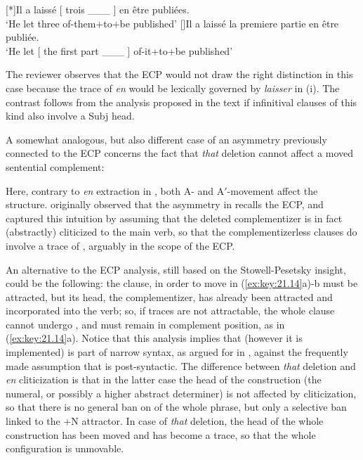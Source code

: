 \documentclass[output=paper]{langsci/langscibook}
\begin{document}
\begin{exe}
{\begin{exe}
    [*]{Il a laissé [ trois \_\_\_ ]  en être publiées.\\
        ‘He let three of-them+to+be published’}
    []{Il a laissé la premiere partie en être publiée.\\
        ‘He let [ the first part \_\_\_ ] of-it+to+be published’}
\end{exe}
%
The reviewer observes that the \gls{ECP} would not draw the right distinction
in this case because the trace of \emph{en} would be lexically governed by
\emph{laisser} in (i). The contrast follows from the analysis proposed in the
text if infinitival clauses of this kind also involve a  Subj\tss{[$+$N]} head.}

A somewhat analogous, but also different case of an asymmetry previously
connected to the \gls{ECP} concerns the fact that \emph{that} deletion cannot
affect a moved sentential complement:

\ea%
    \label{ex:key:21.14}
    \z
\z
%
Here, contrary to \emph{en} extraction in , both A- and A$'$-movement
affect the structure. \citet{Stowell1981} originally observed that the
asymmetry in  recalls the \gls{ECP}, and \citet{Pesetsky1995}
captured this intuition by assuming that the deleted complementizer is in fact
(abstractly) cliticized to the main verb, so that the complementizerless
clauses do involve a trace of , arguably in the scope of the ECP.

An alternative to the \gls{ECP} analysis, still based on the Stowell-Pesetsky
insight, could be the following: the clause, in order to move in
(\ref{ex:key:21.14}a)-b must be attracted, but its head, the complementizer, has
already been attracted and incorporated into the verb; so, if traces are not
attractable, the whole clause cannot undergo , and must remain in
complement position, as in  (\ref{ex:key:21.14}a). Notice that this analysis
implies that  (however it is implemented) is part of narrow
syntax, as argued for in \citet{Roberts2010}, against the frequently made
assumption that  is post-syntactic. The difference between
\emph{that} deletion and \emph{en} cliticization is that in the latter case the
head of the construction (the numeral, or possibly a higher abstract
determiner) is not affected by cliticization, so that there is no general ban
on  of the whole phrase, but only a selective ban linked to the $+$N
attractor. In case of \emph{that} deletion, the head of the whole construction
has been moved and has become a trace, so that the whole configuration is
unmovable.


\end{exe}
\end{document}
